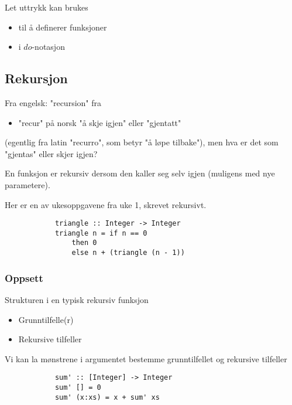 \documentclass{article}
\begin{document}
    Let uttrykk kan brukes
    \begin{itemize}
        \item til å definerer funksjoner
        \item i \( do \)-notasjon
    \end{itemize}


    \subsection{Rekursjon}
    Fra engelsk: "recursion" fra

    \begin{itemize}
        \item "recur" på norsk "å skje igjen" eller "gjentatt"
    \end{itemize}

    (egentlig fra latin "recurro", som betyr "å løpe tilbake"), men hva er det som "gjentas" eller skjer igjen?

    \begin{definition}
        En funksjon er rekursiv dersom den kaller seg selv igjen (muligens med nye parametere).
    \end{definition}    
    \newpage

    \begin{eg}
        Her er en av ukesoppgavene fra uke 1, skrevet rekursivt.
        \begin{lstlisting}
            triangle :: Integer -> Integer
            triangle n = if n == 0
                then 0
                else n + (triangle (n - 1))
        \end{lstlisting}
    \end{eg}

    \subsubsection{Oppsett}

    Strukturen i en typisk rekursiv funksjon

    \begin{itemize}
        \item Grunntilfelle(r)
        \item Rekursive tilfeller
    \end{itemize}

    \begin{eg}
        Vi kan la mønstrene i argumentet bestemme grunntilfellet og rekursive tilfeller

        \begin{lstlisting}
            sum' :: [Integer] -> Integer
            sum' [] = 0
            sum' (x:xs) = x + sum' xs
        \end{lstlisting}
    \end{eg}
\end{document}
